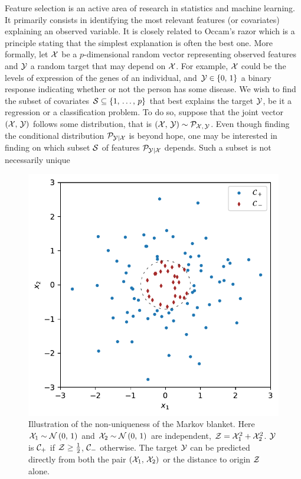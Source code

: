 Feature selection is an active area of research in statistics and machine learning.
It primarily consists in identifying the most relevant features (or covariates) explaining an observed variable.
It is closely related to Occam's razor which is a principle stating that
the simplest explanation is often the best one.
More formally, let $\mathcal{X}$ be a $p$-dimensional random vector representing observed features
and $\mathcal{Y}$ a random target that may depend on $\mathcal{X}$.
For example, $\mathcal{X}$ could be the levels of expression of the genes of an individual,
and $\mathcal{Y} \in \left\{ 0,\, 1 \right\}$ a binary response indicating whether or not the person has some disease.
We wish to find the subset of covariates $\mathcal{S} \subseteq \left\{ 1,\, \dots,\, p \right\}$ that best explains the target $\mathcal{Y}$,
be it a regression or a classification problem.
To do so, suppose that the joint vector $\left( \mathcal{X},\, \mathcal{Y} \right)$ follows some distribution,
that is $\left( \mathcal{X},\, \mathcal{Y} \right) \sim \mathcal{P}_{\mathcal{X},\, \mathcal{Y}}$.
Even though finding the conditional distribution $\mathcal{P}_{\mathcal{Y} \mid \mathcal{X}}$ is beyond hope,
one may be interested in finding on which subset $\mathcal{S}$ of features $\mathcal{P}_{\mathcal{Y} \mid \mathcal{X}}$ depends.
Such a subset is not necessarily unique
\begin{figure}
    \includegraphics[width=0.95\linewidth]{figures/fs_subset_not_unique.pdf}
    \caption{
        Illustration of the non-uniqueness of the Markov blanket.
        Here $\mathcal{X}_1 \sim \mathcal{N}\left( 0,\, 1 \right)$
        and $\mathcal{X}_2 \sim \mathcal{N}\left( 0,\, 1 \right)$ are independent,
        $\mathcal{Z} = \mathcal{X}_1^2 + \mathcal{X}_2^2$.
        $\mathcal{Y}$ is $\mathcal{C}_+$ if $\mathcal{Z} \geq \frac{1}{2}$,
        $\mathcal{C}_-$ otherwise.
        The target $\mathcal{Y}$ can be predicted directly from both the pair $\left( \mathcal{X}_1,\, \mathcal{X}_2 \right)$
        or the distance to origin $\mathcal{Z}$ alone.
    }
    \label{fig:fs_subset_not_unique}
\end{figure}
